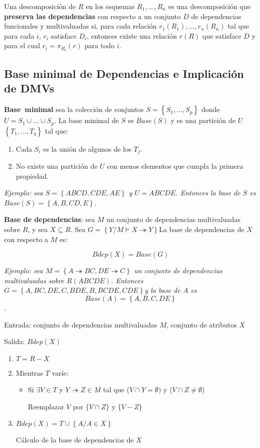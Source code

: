 \documentclass[a4paper, twoside]{article}
\begin{document}
Una descomposición de $R$ en los esquemas $R_{1},\ldots,R_{n}$ es
una descomposición que \textbf{preserva las dependencias} con respecto
a un conjunto $D$ de dependencias funcionales y multivaluadas si,
para cada relación $r_{1}(R_{1}),\ldots,r_{n}(R_{n})$ tal que para
cada $i$, $r_{i}$ satisface $D_{i}$, entonces existe una relación
$r(R)$ que satisface $D$ y para el cual $r_{i}=\pi_{R_{i}}(r)$
para todo $i$.


\subsection{Base minimal de Dependencias e Implicación de DMVs}

\textbf{Base~minimal} sea la colección de conjuntos $S=\left\{ S_{1},\ldots,S_{p}\right\} $
donde $U=S_{1}\cup\ldots\cup S_{p}$. La base minimal de $S$ es $Base(S)$
y es una partición de $U$ $\left\{ T_{1},\ldots,T_{q}\right\} $
tal que:
\begin{enumerate}
\item Cada $S_{i}$ es la unión de algunos de los $T_{j}$.
\item No existe una partición de $U$ con menos elementos que cumpla la
primera propiedad.
\end{enumerate}
\emph{Ejemplo: sea $S=\left\{ ABCD,CDE,AE\right\} $ y $U=ABCDE$.
Entonces la base de $S$ es $Base(S)=\left\{ A,B,CD,E\right\} $.}

\textbf{Base de dependencias}: sea $M$ un conjunto de dependencias
multivaluadas sobre $R$, y sea $X\subseteq R$. Sea $G=\left\{ Y/M\models X\twoheadrightarrow Y\right\} $La
base de dependencias de $X$ con respecto a $M$ es:

\[
Bdep(X)=Base\left(G\right)
\]


\emph{Ejemplo: sea $M=\left\{ A\twoheadrightarrow BC,DE\twoheadrightarrow C\right\} $
un conjunto de dependencias multivaluadas sobre $R(ABCDE)$. Entonces
$G=\left\{ A,BC,DE,C,BDE,B,BCDE,CDE\right\} $y la base de $A$ es
\[
Base(A)=\left\{ A,B,C,DE\right\} 
\]
.}

\begin{algorithm}[H]
Entrada: conjunto de dependencias multivaluadas $M$, conjunto de
atributos $X$

Salida: $Bdep(X)$
\begin{enumerate}
\item $T=R-X$
\item Mientras $T$ varíe:

\begin{itemize}
\item Si $\exists V\in T$ y $Y\twoheadrightarrow Z\in M$ tal que ($V\cap Y=\emptyset)$
y ($V\cap Z\neq\emptyset$)


Reemplazar $V$ por $\{V\cap Z\}$ y $\{V-Z\}$

\end{itemize}
\item $Bdep(X)=T\cup\left\{ A/A\in X\right\} $\protect\caption{Cálculo de la base de dependencias de $X$}
\end{enumerate}
\end{algorithm}
\end{document}
